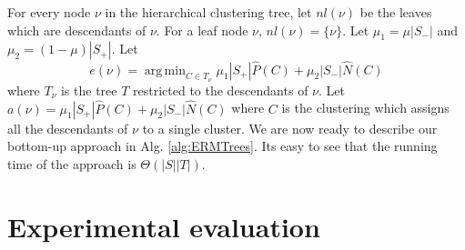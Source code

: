 \documentclass[12pt]{article}
\DeclareMathOperator*{\argmin}{arg\,min}
\begin{document}
For every node $\nu$ in the hierarchical clustering tree, let $nl(\nu)$ be the leaves which are descendants of $\nu$. For a leaf node $\nu$, $nl(\nu) = \{\nu\}$. Let $\mu_1 = \mu|S_-|$ and $\mu_2 = (1-\mu)|S_+|$. Let $$e(\nu) = \argmin_{C \in T_{\nu}} \mu_1|S_+|\hat P(C) + \mu_2|S_-|\hat N(C)$$ where $T_{\nu}$ is the tree $T$ restricted to the descendants of $\nu$. Let $a(\nu) = \mu_1|S_+|\hat P(C) + \mu_2|S_-|\hat N(C)$ where $C$ is the clustering which assigns all the descendants of $\nu$ to a single cluster. We are now ready to describe our bottom-up approach in Alg. \ref{alg:ERMTrees}. Its easy to see that the running time of the approach is $\Theta(|S||T|)$. 

\section{Experimental evaluation}
\label{sec:evaluation}
\end{document}
